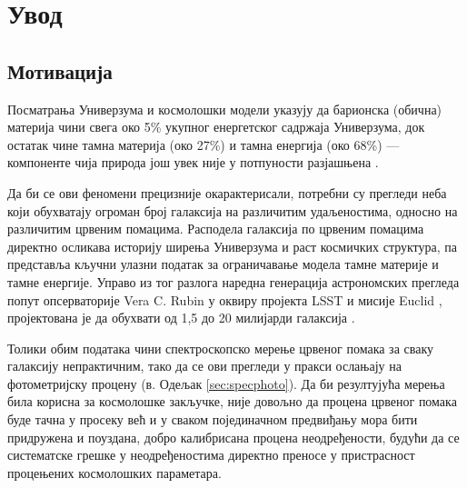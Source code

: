 \documentclass[12pt,oneside]{memoir}
\begin{document}
\frontmatter
\naslovna
\komisija
\tableofcontents*

\mainmatter

\chapter{Увод}
\section{Мотивација}

Посматрања Универзума и космолошки модели указују да барионска (обична) материја
\cite{swinburne2026baryonicmatter} чини свега око 5\% укупног енергетског садржаја 
Универзума, док остатак чине тамна материја (око 27\%) и тамна енергија (око 68\%) 
— компоненте чија природа још увек није у потпуности разјашњена \cite{nasa2026darkmatter, nasa2026darkenergy}.

Да би се ови феномени прецизније окарактерисали, потребни су прегледи
неба који обухватају огроман број галаксија на различитим удаљеностима,
односно на различитим црвеним помацима. Расподела галаксија по црвеним помацима директно
осликава историју ширења Универзума и раст космичких структура, па
представља кључни улазни податак за ограничавање модела тамне материје и
тамне енергије. Управо из тог разлога наредна генерација астрономских прегледа попут
опсерваторије Vera C. Rubin \cite{rubin2026about} у оквиру пројекта LSST \cite{rubin2026lsst} 
и мисије Euclid \cite{esa2026euclid}, пројектована је да обухвати од 1,5 до 20 милијарди галаксија
\cite{jones2024a}.

Толики обим података чини спектроскопско мерење црвеног помака за сваку галаксију
непрактичним, тако да се ови прегледи у пракси ослањају на фотометријску
процену (в. Одељак \ref{sec:specphoto}). 
Да би резултујућа мерења била корисна за космолошке закључке, није
довољно да процена црвеног помака буде тачна у просеку већ и у сваком појединачном
предвиђању мора бити придружена и поуздана, добро калибрисана процена
неодређености, будући да се систематске грешке у неодређеностима директно
преносе у пристрасност процењених космолошких параметара.
\end{document}
